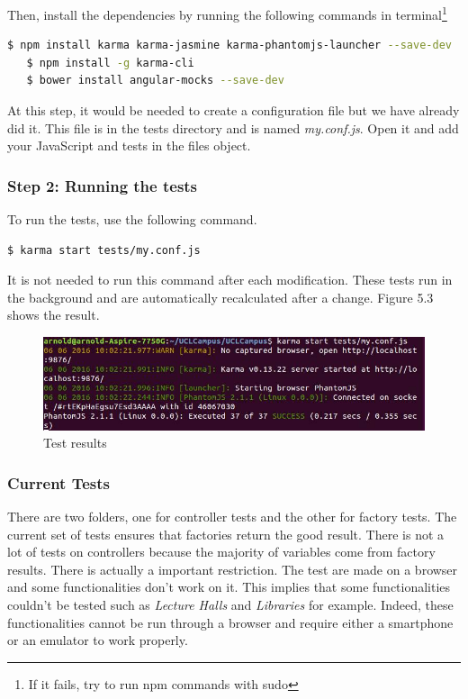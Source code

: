 \documentclass{eplmastersthesis}
\begin{document}
Then, install the dependencies by running the following commands in terminal\footnote{If it fails, try to run npm commands with sudo}
\begin{lstlisting}[language=bash]
   $ npm install karma karma-jasmine karma-phantomjs-launcher --save-dev
   $ npm install -g karma-cli
   $ bower install angular-mocks --save-dev
\end{lstlisting}

At this step, it would be needed to create a configuration file but we have already did it. This file is in the tests directory and is named \textit{my.conf.js}. Open it and add your JavaScript and tests in the files object.

\subsubsection{Step 2: Running the tests} 
To run the tests, use the following command.
\begin{lstlisting}[language=bash]
   $ karma start tests/my.conf.js
\end{lstlisting}
It is not needed to run this command after each modification. These tests run in the background and are automatically recalculated after a change. Figure 5.3 shows the result.
\begin{figure}[H]
\centering
\includegraphics[scale = 0.7]{Images/tests.png}
\caption{Test results}
\end{figure}

\subsubsection{Current Tests}
There are two folders, one for controller tests and the other for factory tests. The current set of tests ensures that factories return the good result. There is not a lot of tests on controllers because the majority of variables come from factory results. There is actually a important restriction. The test are made on a browser and some functionalities don't work on it. This implies that some functionalities couldn't be tested such as \textit{Lecture Halls} and\textit{ Libraries }for example. Indeed, these functionalities cannot be run through a browser and require either a smartphone or an emulator to work properly. 
\end{document}
